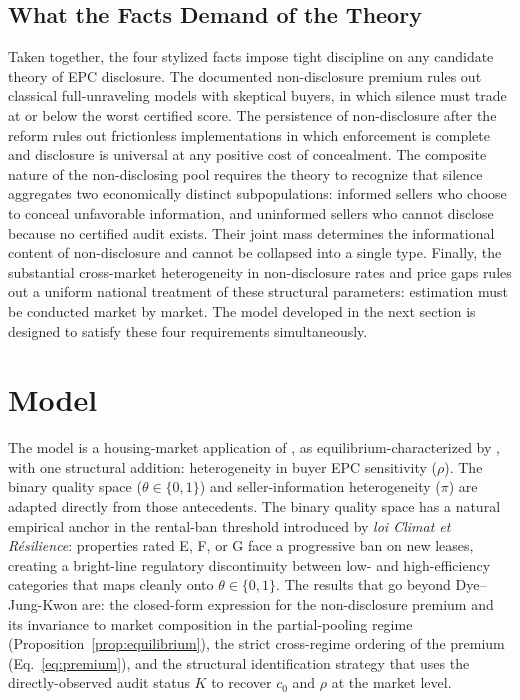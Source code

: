\documentclass[10pt,letterpaper]{bp-template-concise}
\begin{document}
\subsection{What the Facts Demand of the Theory}
\label{ss:facts_demand}

Taken together, the four stylized facts impose tight discipline on any candidate theory of EPC disclosure. The documented non-disclosure premium rules out classical full-unraveling models with skeptical buyers, in which silence must trade at or below the worst certified score. The persistence of non-disclosure after the reform rules out frictionless implementations in which enforcement is complete and disclosure is universal at any positive cost of concealment. The composite nature of the non-disclosing pool requires the theory to recognize that silence aggregates two economically distinct subpopulations: informed sellers who choose to conceal unfavorable information, and uninformed sellers who cannot disclose because no certified audit exists. Their joint mass determines the informational content of non-disclosure and cannot be collapsed into a single type. Finally, the substantial cross-market heterogeneity in non-disclosure rates and price gaps rules out a uniform national treatment of these structural parameters: estimation must be conducted market by market. The model developed in the next section is designed to satisfy these four requirements simultaneously.

\section{Model}
\label{sec:model}

The model is a housing-market application of \citet{dye_disclosure_1985}, as equilibrium-characterized by \citet{jung_kwon_1988}, with one structural addition: heterogeneity in buyer EPC sensitivity ($\rho$). The binary quality space ($\theta\in\{0,1\}$) and seller-information heterogeneity ($\pi$) are adapted directly from those antecedents. The binary quality space has a natural empirical anchor in the rental-ban threshold introduced by \emph{loi Climat et R\'esilience}: properties rated E, F, or G face a progressive ban on new leases, creating a bright-line regulatory discontinuity between low- and high-efficiency categories that maps cleanly onto $\theta\in\{0,1\}$. The results that go beyond Dye--Jung-Kwon are: the closed-form expression for the non-disclosure premium and its invariance to market composition in the partial-pooling regime (Proposition~\ref{prop:equilibrium}), the strict cross-regime ordering of the premium (Eq.~\ref{eq:premium}), and the structural identification strategy that uses the directly-observed audit status $K$ to recover $c_0$ and $\rho$ at the market level.
\end{document}
